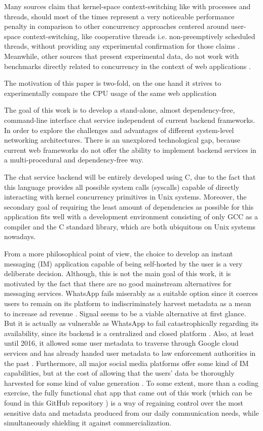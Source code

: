 Many sources claim that kernel-space context-switching like with processes and threads, should most of the times represent a very noticeable performance penalty in comparison to other concurrency approaches centered around user-space context-switching, like cooperative threads i.e. non-preemptively scheduled threads, without providing any experimental confirmation for those claims \cite{2003Events}\cite{2005Threads}\cite{Cox-Buday2017}\cite{Kerrisk2010}. Meanwhile, other sources that present experimental data, do not work with benchmarks directly related to concurrency in the context of web applications \cite{2013ContextSwitching}. 

The motivation of this paper is two-fold, on the one hand it strives to experimentally compare the CPU usage of the same web application 

The goal of this work is to develop a stand-alone, almost dependency-free, command-line interface chat service independent of current backend frameworks. In order to explore the challenges and advantages of different system-level networking architectures. There is an unexplored technological gap, because current web frameworks do not offer the ability to implement backend services in a multi-procedural and dependency-free way. 

The chat service backend will be entirely developed using C, due to the fact that this language provides all possible system calls (syscalls) capable of directly interacting with kernel concurrency primitives in Unix systems. Moreover, the secondary goal of requiring the least amount of dependencies as possible for this application fits well with a development environment consisting of only GCC as a compiler and the C standard library, which are both ubiquitous on Unix systems nowadays. 

From a more philosophical point of view, the choice to develop an instant messaging (IM) application capable of being self-hosted by the user is a very deliberate decision. Although, this is not the main goal of this work, it is motivated by the fact that there are no good mainstream alternatives for messaging services. WhatsApp fails miserably as a suitable option since it coerces users to remain on its platform to indiscriminately harvest metadata as a mean to increase ad revenue \cite{Kumar2021}. Signal seems to be a viable alternative at first glance. But it is actually as vulnerable as WhatsApp to fail catastrophically regarding its availability, since its backend is a centralized and closed platform \cite{Hodgson2020}. Also, at least until 2016, it allowed some user metadata to traverse through Google cloud services \cite{Edge2016} and has already handed user metadata to law enforcement authorities in the past \cite{Kaufman2016}. Furthermore, all major social media platforms offer some kind of IM capabilities, but at the cost of allowing that the users' data be thoroughly harvested for some kind of value generation \cite{socialmedia2017}. To some extent, more than a coding exercise, the fully functional chat app that came out of this work (which can be found in this GitHub repository \cite{Rodriguez2022}) is a way of regaining control over the most sensitive data and metadata produced from our daily communication needs, while simultaneously shielding it against commercialization.